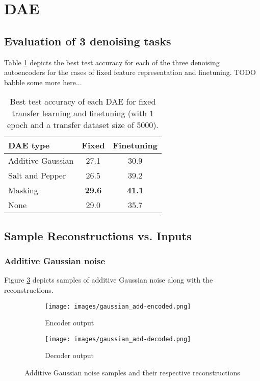 \documentclass[10pt, a4paper]{article}
\title{\mytitle}
\author{\myauthor\hspace{1em}\\\contact\\University of Bern\hspace{0.5em}-\hspace{0.5em}\mymodule}
\date{}
\begin{document}
	\maketitle
    
	\section{DAE}
    \subsection{Evaluation of 3 denoising tasks}
    Table \ref{table:ta} depicts the best test accuracy for each of the three denoising autoencoders for the cases of fixed feature representation and finetuning. 
    TODO babble some more here...
    
    \begin{table}
    \begin{center}
    \begin{tabular}{|l|c|c|}
    \hline
    DAE type & Fixed & Finetuning \\
    \hline\hline
    Additive Gaussian & 27.1 & 30.9 \\
    Salt and Pepper & 26.5 & 39.2 \\
    Masking & \textbf{29.6} & \textbf{41.1} \\
    None & 29.0 & 35.7 \\
    \hline
    \end{tabular}
    \end{center}
    \caption{Best test accuracy of each DAE for fixed transfer learning and finetuning (with 1 epoch and a transfer dataset size of 5000).}
    \label{table:ta}
    \end{table}
    
    \subsection{Sample Reconstructions vs. Inputs}
    \subsubsection{Additive Gaussian noise}
    Figure \ref{fig:figag} depicts samples of additive Gaussian noise along with the reconstructions.
    
    \begin{figure}[h]
    \begin{subfigure}{0.2\textwidth}
    \texttt{[image: images/gaussian\_add-encoded.png]} 
    \caption{Encoder output}
    \label{fig:subim1}
    \end{subfigure}
    \begin{subfigure}{0.2\textwidth}
    \texttt{[image: images/gaussian\_add-decoded.png]}
    \caption{Decoder output}
    \label{fig:subim2}
    \end{subfigure}
    \caption{Additive Gaussian noise samples and their respective reconstructions}
    \label{fig:figag}
    \end{figure}
    
\end{document}
